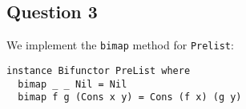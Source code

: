 \subsection{Question 3}

We implement the \lstinline{bimap} method for \lstinline{Prelist}:

\begin{lstlisting}
instance Bifunctor PreList where
  bimap _ _ Nil = Nil
  bimap f g (Cons x y) = Cons (f x) (g y)
\end{lstlisting}
